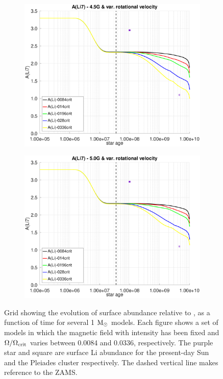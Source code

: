 \documentclass[fleqn,usenatbib]{mnras}
\begin{document}
\begin{figure}
    \begin{subfigure}[h]{0.47\textwidth}
    \includegraphics[trim = 25mm 10mm 15mm 10mm, clip,width=\textwidth]{figures/li_var_vel_4_5g.eps}
    \label{fig:subim5}
    \end{subfigure}
    \begin{subfigure}[h]{0.47\textwidth}
    \includegraphics[trim = 25mm 10mm 15mm 10mm, clip,width=\textwidth]{figures/li_var_vel_5_0g.eps}
    \label{fig:subim6}
    \end{subfigure}
\caption{Grid showing the evolution of surface  abundance relative to , as a function of time for several 1 $\mathrm{M}_\odot$ models. Each figure shows a set of models in which the magnetic field with intensity has been fixed and $\Omega / \Omega_{\mathrm{crit}}$ varies between 0.0084 and 0.0336, respectively. The purple star and square are surface Li abundance for the present-day Sun \citep{Asplund2009} and the Pleiades cluster \citep{Sestito2005} respectively. The dashed vertical line makes reference to the ZAMS.}
\label{fig:grid_li_var_vel}
\end{figure}
\par
\end{document}
